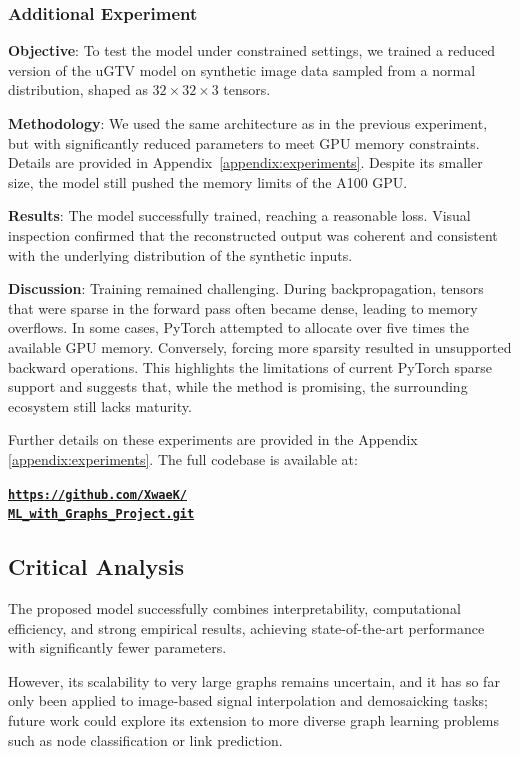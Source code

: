 \documentclass{article}
\theoremstyle{plain}
\theoremstyle{definition}
\theoremstyle{remark}
\begin{document}
\subsubsection{Additional Experiment}

\textbf{Objective}: To test the model under constrained settings, we trained a reduced version of the uGTV model on synthetic image data sampled from a normal distribution, shaped as $32 \times 32 \times 3$ tensors.

\textbf{Methodology}: We used the same architecture as in the previous experiment, but with significantly reduced parameters to meet GPU memory constraints. Details are provided in Appendix~\ref{appendix:experiments}. Despite its smaller size, the model still pushed the memory limits of the A100 GPU.

\textbf{Results}: The model successfully trained, reaching a reasonable loss. Visual inspection confirmed that the reconstructed output was coherent and consistent with the underlying distribution of the synthetic inputs.

\textbf{Discussion}: Training remained challenging. During backpropagation, tensors that were sparse in the forward pass often became dense, leading to memory overflows. In some cases, PyTorch attempted to allocate over five times the available GPU memory. Conversely, forcing more sparsity resulted in unsupported backward operations. This highlights the limitations of current PyTorch sparse support and suggests that, while the method is promising, the surrounding ecosystem still lacks maturity.

Further details on these experiments are provided in the Appendix \ref{appendix:experiments}. The full codebase is available at:
\begin{center}
\vskip -0.1in
\href{https://github.com/XwaeK/ML_with_Graphs_Project.git}{\textbf{\texttt{https://github.com/XwaeK/\\ML\_with\_Graphs\_Project.git}}}
\vskip -0.1in
\end{center}

\subsection{Critical Analysis}

The proposed model successfully combines interpretability, computational efficiency, and strong empirical results, achieving state-of-the-art performance with significantly fewer parameters.

However, its scalability to very large graphs remains uncertain, and it has so far only been applied to image-based signal interpolation and demosaicking tasks; future work could explore its extension to more diverse graph learning problems such as node classification or link prediction.
\end{document}
